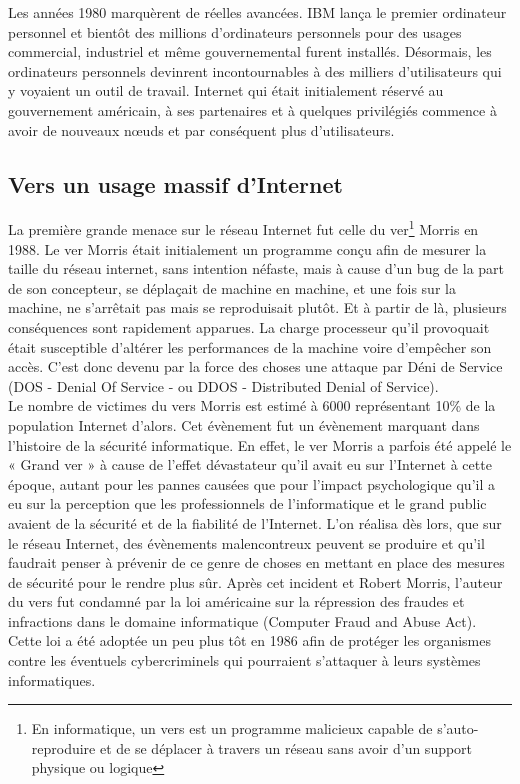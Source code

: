Les années 1980 marquèrent de réelles avancées. IBM lança le premier ordinateur personnel et bientôt des millions d’ordinateurs personnels pour des usages commercial, industriel et même gouvernemental furent installés. Désormais, les ordinateurs personnels devinrent incontournables à des milliers d’utilisateurs qui y voyaient un outil de travail. Internet qui était initialement réservé au gouvernement américain, à ses partenaires et à quelques privilégiés commence à avoir de nouveaux nœuds et par conséquent plus d’utilisateurs. 
\subsection{Vers un usage massif d'Internet}
La première grande menace sur le réseau Internet fut celle du ver\footnote{En informatique, un vers est un programme malicieux capable de s’auto-reproduire et de se déplacer à travers un réseau sans avoir d’un support physique ou logique} Morris \cite{morris-worm} en 1988. Le ver Morris  était initialement un programme conçu afin de mesurer la taille du réseau internet, sans intention néfaste, mais à cause d’un bug de la part de son concepteur, se déplaçait de machine en machine, et une fois sur la machine, ne s’arrêtait pas mais se reproduisait plutôt. Et à partir de là, plusieurs conséquences sont rapidement apparues. La charge processeur qu’il provoquait était susceptible d’altérer les performances de la machine voire d’empêcher son accès. C’est donc devenu par la force des choses une attaque par Déni de Service (DOS   - Denial Of Service - ou DDOS - Distributed Denial of Service). \\
Le nombre de victimes du vers Morris est estimé à 6000 représentant 10\% de la population Internet d’alors. Cet évènement fut un évènement marquant dans l’histoire de la sécurité informatique. En  effet, le ver Morris a parfois été appelé le « Grand ver » à cause de l'effet dévastateur qu'il avait eu sur l'Internet à cette époque, autant pour les pannes causées que pour l'impact psychologique qu'il a eu sur la perception que les professionnels de l’informatique et le grand public avaient de la sécurité et de la fiabilité de l'Internet. L’on réalisa dès lors, que sur le réseau Internet, des évènements malencontreux peuvent se produire et qu’il faudrait penser à prévenir de ce genre de choses en mettant en place des mesures de sécurité pour le rendre plus sûr. Après cet incident et Robert Morris, l’auteur du vers fut condamné par la loi américaine sur la répression des fraudes et infractions dans le domaine informatique (Computer Fraud and Abuse Act). Cette loi a été adoptée un peu plus tôt en 1986 afin de protéger les organismes contre les éventuels cybercriminels qui pourraient s’attaquer à leurs systèmes informatiques.
